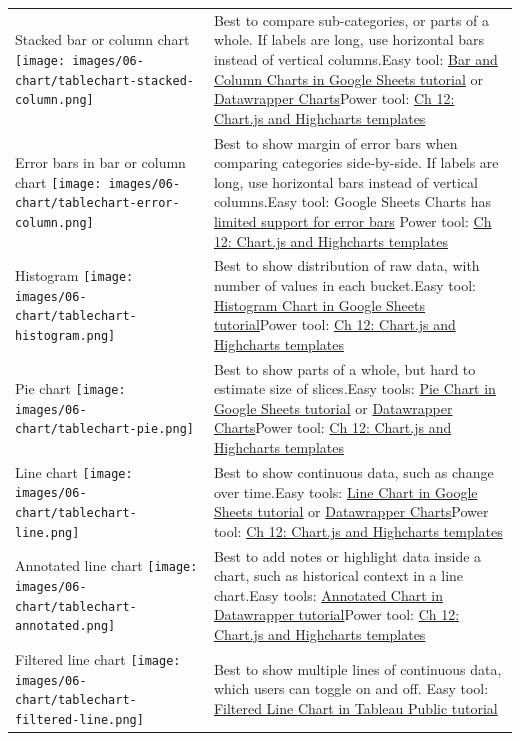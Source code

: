 \documentclass[
  english,
]{book}
\begin{document}
\begin{longtable}[]{@{}
  >{\raggedright\arraybackslash}p{}
  >{\raggedright\arraybackslash}p{}@{}}
Stacked bar or column chart \texttt{[image: images/06-chart/tablechart-stacked-column.png]} & Best to compare sub-categories, or parts of a whole. If labels are long, use horizontal bars instead of vertical columns.Easy tool: \href{bar-column-google.html}{Bar and Column Charts in Google Sheets tutorial} or \href{chart-datawrapper.html}{Datawrapper Charts}Power tool: \href{chartcode.html}{Ch 12: Chart.js and Highcharts templates} \\
Error bars in bar or column chart \texttt{[image: images/06-chart/tablechart-error-column.png]} & Best to show margin of error bars when comparing categories side-by-side. If labels are long, use horizontal bars instead of vertical columns.Easy tool: Google Sheets Charts has \href{bar-column-google.html}{limited support for error bars} Power tool: \href{chartcode.html}{Ch 12: Chart.js and Highcharts templates} \\
Histogram \texttt{[image: images/06-chart/tablechart-histogram.png]} & Best to show distribution of raw data, with number of values in each bucket.Easy tool: \href{histogram-google.html}{Histogram Chart in Google Sheets tutorial}Power tool: \href{chartcode.html}{Ch 12: Chart.js and Highcharts templates} \\
Pie chart \texttt{[image: images/06-chart/tablechart-pie.png]} & Best to show parts of a whole, but hard to estimate size of slices.Easy tools: \href{pie-line-area-google.html}{Pie Chart in Google Sheets tutorial} or \href{chart-datawrapper.html}{Datawrapper Charts}Power tool: \href{chartcode.html}{Ch 12: Chart.js and Highcharts templates} \\
Line chart \texttt{[image: images/06-chart/tablechart-line.png]} & Best to show continuous data, such as change over time.Easy tools: \href{pie-line-area-google.html}{Line Chart in Google Sheets tutorial} or \href{chart-datawrapper.html}{Datawrapper Charts}Power tool: \href{chartcode.html}{Ch 12: Chart.js and Highcharts templates} \\
Annotated line chart \texttt{[image: images/06-chart/tablechart-annotated.png]} & Best to add notes or highlight data inside a chart, such as historical context in a line chart.Easy tools: \href{annotated-datawrapper.html}{Annotated Chart in Datawrapper tutorial}Power tool: \href{chartcode.html}{Ch 12: Chart.js and Highcharts templates} \\
Filtered line chart \texttt{[image: images/06-chart/tablechart-filtered-line.png]} & Best to show multiple lines of continuous data, which users can toggle on and off. Easy tool: \href{filtered-line-tableau.html}{Filtered Line Chart in Tableau Public tutorial} \\

\end{longtable}
\end{document}
